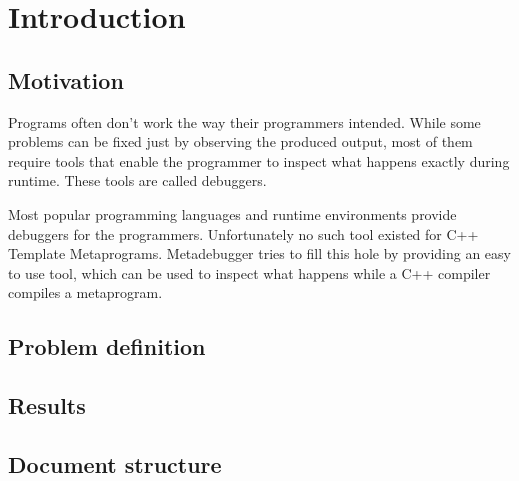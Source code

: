 
\chapter{Introduction}

\section{Motivation}

Programs often don't work the way their programmers intended. While some
problems can be fixed just by observing the produced output, most of them
require tools that enable the programmer to inspect what happens exactly
during runtime. These tools are called debuggers.

Most popular programming languages and runtime environments provide debuggers
for the programmers. Unfortunately no such tool existed for C++ Template
Metaprograms. Metadebugger tries to fill this hole by providing an easy to use
tool, which can be used to inspect what happens while a C++ compiler compiles a
metaprogram.

\section{Problem definition}

\section{Results} %

\section{Document structure} %
